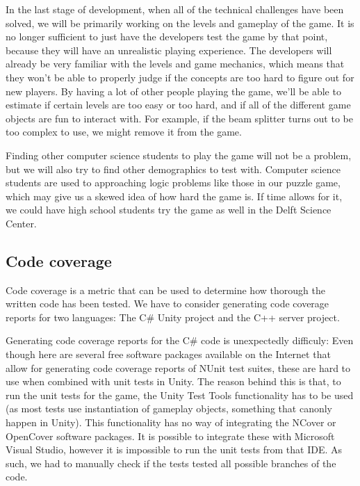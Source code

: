 			In the last stage of development, when all of the technical
			challenges have been solved, we will be primarily working on the
			levels and gameplay of the game. It is no longer sufficient to just
			have the developers test the game by that point, because they will
			have an unrealistic playing experience. The developers will already
			be very familiar with the levels and game mechanics, which means
			that they won't be able to properly judge if the concepts are too
			hard to figure out for new players. By having a lot of other people
			playing the game, we'll be able to estimate if certain levels are
			too easy or too hard, and if all of the different game objects are
			fun to interact with. For example, if the beam splitter turns out to
			be too complex to use, we might remove it from the game.

			Finding other computer science students to play the game will not be
			a problem, but we will also try to find other demographics to test
			with. Computer science students are used to approaching logic
			problems like those in our puzzle game, which may give us a skewed
			idea of how hard the game is. If time allows for it, we could have
			high school students try the game as well in the Delft Science
			Center.
		
		\subsection{Code coverage} \label{ssec:codecoverage}
			Code coverage is a metric that can be used to determine how thorough
			the written code has been tested. We have to consider generating 
            code coverage reports for two languages: The C\# Unity project and 
            the C++ server project. 
            
            Generating code coverage reports for the C\# code is unexpectedly 
            difficuly: Even though here are several free software packages 
            available on the Internet that allow for generating code
			coverage reports of NUnit test suites, these are hard to use when 
            combined with unit tests in Unity. The reason behind this is that, 
            to run the unit tests for the game, the Unity Test Tools 
            functionality has to be used (as most tests use instantiation of 
            gameplay objects, something that canonly happen in Unity). This 
            functionality has no way of integrating the NCover or OpenCover 
            software packages. It is possible to integrate these with Microsoft 
            Visual Studio, however it is impossible to run the unit tests from 
            that IDE. As such, we had to manually check if the tests tested all 
            possible branches of the code.
            

